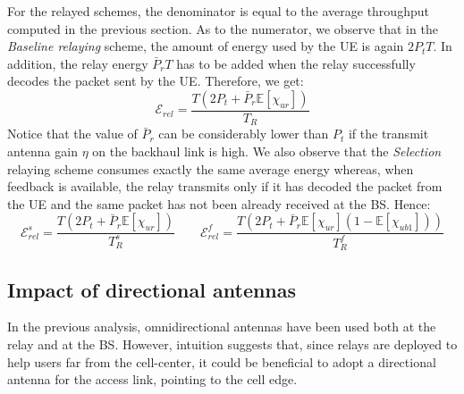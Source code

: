 \documentclass[12pt, letterpaper, onecolumn, draftcls]{IEEEtran}
\begin{document}
For the relayed schemes, the denominator is equal to the average throughput computed in the previous section. As to the numerator, we observe that in the \textit{Baseline relaying} scheme, the amount of energy used by the UE is again $2P_tT$. In addition, the relay energy $\bar{P}_rT$ has to be added when the relay successfully decodes the packet sent by the UE. Therefore, we get:
\begin{equation}
 \mathcal{E}_{rel} = \frac{T(2P_t + \bar{P}_r\mathbb{E}[\chi_{ur}])}{T_R}
\end{equation}
Notice that the value of $\bar{P}_r$ can be considerably lower than $P_t$ if the transmit antenna gain $\eta$ on the backhaul link is high. We also observe that the \textit{Selection} relaying scheme consumes exactly the same average energy whereas, when feedback is available, the relay transmits only if it has decoded the packet from the UE and the same packet has not been already received at the BS. Hence:
\begin{equation}
 \mathcal{E}_{rel}^s = \frac{T(2P_t + \bar{P}_r\mathbb{E}[\chi_{ur}])}{T_R^s} \quad\quad \mathcal{E}_{rel}^f = \frac{T(2P_t + \bar{P}_r\mathbb{E}[\chi_{ur}]\left(1 - \mathbb{E}[\chi_{ub1}]\right))}{T_R^f}
\end{equation}


\subsection{Impact of directional antennas}
In the previous analysis, omnidirectional antennas have been used both at the relay and at the BS. However, intuition suggests that, since relays are deployed to help users far from the cell-center, it could be beneficial to adopt a directional antenna for the access link, pointing to the cell edge.
\end{document}

